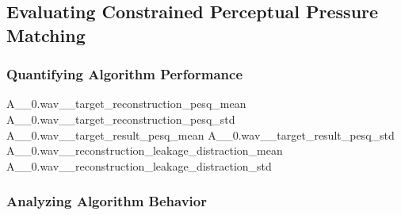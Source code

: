 \subsection{Evaluating Constrained Perceptual Pressure Matching}

\subsubsection*{Quantifying Algorithm Performance}
\constrainingplot
{A__0.wav__target_reconstruction_pesq_mean}
{A__0.wav__target_reconstruction_pesq_std}
{A__0.wav__target_result_pesq_mean}
{A__0.wav__target_result_pesq_std}
{A__0.wav__reconstruction_leakage_distraction_mean}
{A__0.wav__reconstruction_leakage_distraction_std}

\subsubsection*{Analyzing Algorithm Behavior}

